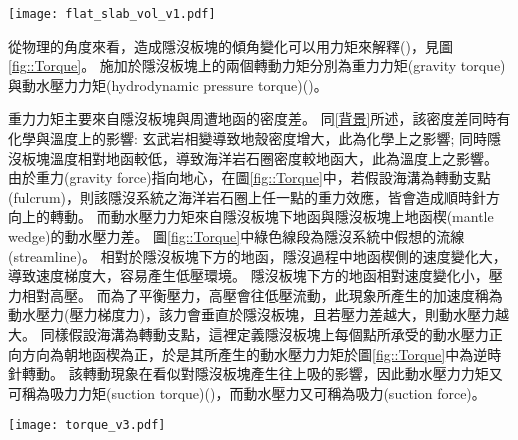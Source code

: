 \begin{figure*}[hp]
    \centering
    \texttt{[image: flat\_slab\_vol\_v1.pdf]}
    \caption[研究區域板塊構造圖]{研究區域板塊構造圖，灰色實線為板塊邊界，資料來自\citealp{bird2003updated}，橘紅色三角形為火山分佈，資料來自\citealp{venzke2013global}，黑色虛線為每50公里深之板塊等深度線，其中50、100與150公里等深度線加粗，資料來自\citealp{hayes2018slab2}。黃色框框圈起處為平坦隱沒位置，由北到南分別位於墨西哥、秘魯與智利。
    }
    \label{fig::flat_slab_vol}
\end{figure*}

從物理的角度來看，造成隱沒板塊的傾角變化可以用力矩來解釋(\citealp{stevenson1977angle})，見圖\ref{fig::Torque}。
施加於隱沒板塊上的兩個轉動力矩分別為重力力矩(gravity torque)與動水壓力力矩(hydrodynamic pressure torque)(\citealp{McKenzie1969})。

重力力矩主要來自隱沒板塊與周遭地函的密度差。
同\ref{背景}所述，該密度差同時有化學與溫度上的影響: 玄武岩相變導致地殼密度增大，此為化學上之影響; 同時隱沒板塊溫度相對地函較低，導致海洋岩石圈密度較地函大，此為溫度上之影響。
由於重力(gravity force)指向地心，在圖\ref{fig::Torque}中，若假設海溝為轉動支點(fulcrum)，則該隱沒系統之海洋岩石圈上任一點的重力效應，皆會造成順時針方向上的轉動。
而動水壓力力矩來自隱沒板塊下地函與隱沒板塊上地函楔(mantle wedge)的動水壓力差。
圖\ref{fig::Torque}中綠色線段為隱沒系統中假想的流線(streamline)。
相對於隱沒板塊下方的地函，隱沒過程中地函楔側的速度變化大，導致速度梯度大，容易產生低壓環境。
隱沒板塊下方的地函相對速度變化小，壓力相對高壓。
而為了平衡壓力，高壓會往低壓流動，此現象所產生的加速度稱為動水壓力(壓力梯度力)，該力會垂直於隱沒板塊，且若壓力差越大，則動水壓力越大。
同樣假設海溝為轉動支點，這裡定義隱沒板塊上每個點所承受的動水壓力正向方向為朝地函楔為正，於是其所產生的動水壓力力矩於圖\ref{fig::Torque}中為逆時針轉動。
該轉動現象在看似對隱沒板塊產生往上吸的影響，因此動水壓力力矩又可稱為吸力力矩(suction torque)(\citealp{tovish1978mantle})，而動水壓力又可稱為吸力(suction force)。

\begin{figure*}[ht!]
    \centering
    \texttt{[image: torque\_v3.pdf]}
    \caption[隱沒系統中施加於隱沒板塊上的轉動力矩]{隱沒系統中施加於隱沒板塊上的轉動力矩，包含重力力矩與動水壓力力矩。綠色線為軟流圈(asthenosphere)中的假想流線，灰圓底紅字H代表高壓區，灰圓底藍字代表低壓區。假設海溝為支點，大於0之重力力矩在該系統中施予一順時針方向上的轉動，反之大於0之動水壓力力矩施予一逆時針方向上的轉動。
    }
    \label{fig::Torque}
\end{figure*}

